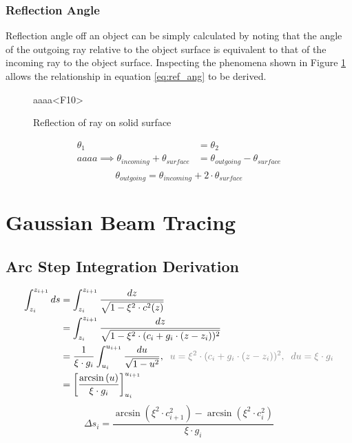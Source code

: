 \documentclass{article}
\begin{document}
\subsubsection{Reflection Angle}
Reflection angle off an object can be simply calculated by noting that the angle of the outgoing ray relative to the object surface is equivalent to that of the incoming ray to the object surface. Inspecting the phenomena shown in Figure \ref{fig:reflect_diagram} allows the relationship in equation \ref{eq:ref_ang} to be derived.
\begin{figure}[H]
  \centering
  
  \caption{Reflection of ray on solid surface}
  \label{fig:reflect_diagram}aaaa<F10>
\end{figure}
\begin{align*}
  \theta_1 &= \theta_2 \\aaaa
  \implies \theta_{incoming} + \theta_{surface} &= \theta_{outgoing} - \theta_{surface}\\   
\end{align*}
\begin{equation}
  \label{eq:ref_ang}
  \theta_{outgoing} = \theta_{incoming} + 2\cdot\theta_{surface}
\end{equation}

\section{Gaussian Beam Tracing}
\subsection{Arc Step Integration Derivation}
\begin{align*}
  \int_{z_i}^{z_{i+1}}ds &= \int_{z_i}^{z_{i+1}}\frac{dz}{\sqrt{1-\xi^2\cdot c^2(z)}} \\
  &= \int_{z_i}^{z_{i+1}}\frac{dz}{\sqrt{1-\xi^2\cdot (c_i + g_i\cdot(z - z_i))^2}} \\  
  &= \frac{1}{\xi\cdot g_i}\int_{u_i}^{u_{i+1}}\frac{du}{\sqrt{1-u^2}},\;\;\textcolor{gray}{u=\xi^2\cdot(c_i + g_i\cdot(z - z_i))^2,\;\;du=\xi\cdot g_i} \\  
  &=\left[\frac{\arcsin{(u)}}{\xi\cdot g_i}\right]_{u_i}^{u_{i+1}}
\end{align*}
\begin{equation}
  \label{eq:arc_step}
  \Delta s_i = \frac{\arcsin{(\xi^2\cdot c_{i+1}^2)} - \arcsin{(\xi^2\cdot c_{i}^2)}}{\xi\cdot g_i}
\end{equation}
\end{document}
